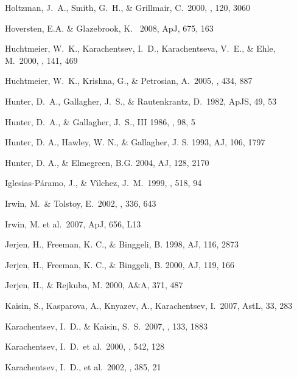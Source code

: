 \documentclass[preprint]{aastex}
\begin{document}
\begin{thebibliography}{}
Holtzman, J.~A., Smith, G.~H., \& Grillmair, C.\ 2000, \aj, 120, 3060 

Hoversten, E.A. \& Glazebrook, K. \ 2008, ApJ, 675, 163 

Huchtmeier, W.~K., Karachentsev, I.~D., Karachentseva, V.~E., \& 
   Ehle, M.\ 2000, \aaps, 141, 469 

Huchtmeier, W.~K., Krishna, G., \& Petrosian, A.\ 2005, \aap, 434, 887 

Hunter, D.~A., Gallagher, J.~S., \& Rautenkrantz, D.\ 1982, ApJS, 49, 53


Hunter, D.~A., \& Gallagher, J.~S., III 1986, \pasp, 98, 5 

Hunter, D. A., Hawley, W. N., \& Gallagher, J. S. 1993, AJ, 106, 1797

Hunter, D. A., \& Elmegreen, B.G. 2004, AJ, 128, 2170

Iglesias-P{\'a}ramo, J., \& V{\'{\i}}lchez, J.~M.\ 1999, \apj, 518, 94 

Irwin, M.~\& Tolstoy, E.\ 2002, \mnras, 336, 643 

Irwin, M. et al.\ 2007, ApJ, 656, L13 

Jerjen, H., Freeman, K. C., \& Binggeli, B. 1998, AJ, 116, 2873

Jerjen, H., Freeman, K. C., \& Binggeli, B. 2000, AJ, 119, 166 
 
Jerjen, H., \& Rejkuba, M. 2000, A\&A, 371, 487 

Kaisin, S., Kasparova, A., Knyazev, A., Karachentsev, I.\ 2007, AstL, 33, 283 

Karachentsev, I.~D., \& Kaisin, S.~S.\ 2007, \aj, 133, 1883 

Karachentsev, I.~D.~et al.\ 2000, \apj, 542, 128 

Karachentsev, I.~D., et al.\ 2002, \aap, 385, 21


\end{thebibliography}
\end{document}
